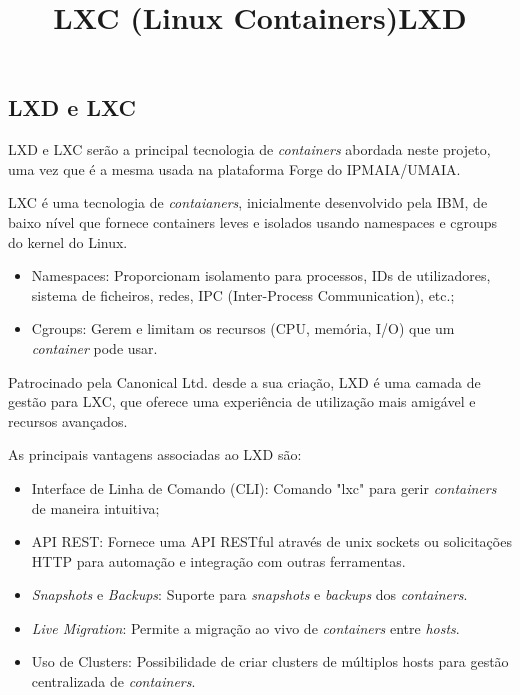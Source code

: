 \subsection{LXD e LXC}

LXD e LXC serão a principal tecnologia de \textit{containers} abordada neste projeto,
uma vez que é a mesma usada na plataforma Forge do IPMAIA/UMAIA. \\



\title*{\textbf{LXC (Linux Containers)}}

LXC é uma tecnologia de \textit{contaianers}, inicialmente desenvolvido pela IBM, 
de baixo nível que fornece containers leves e isolados usando namespaces e cgroups 
do kernel do Linux. \\

\begin{itemize}
    \item Namespaces: Proporcionam isolamento para processos, IDs de utilizadores, 
    sistema de ficheiros, redes, IPC (Inter-Process Communication), etc.;
    \item Cgroups: Gerem e limitam os recursos (CPU, memória, I/O) que um
    \textit{container} pode usar.
\end{itemize}

\title*{\textbf{LXD}}

Patrocinado pela Canonical Ltd. desde a sua  criação, LXD é uma camada de gestão para LXC, 
que oferece uma experiência de utilização mais amigável e recursos avançados.

As principais vantagens associadas ao LXD são:
\begin{itemize}
\item Interface de Linha de Comando (CLI): Comando "lxc" para gerir \textit{containers}
de maneira intuitiva;
\item API REST: Fornece uma API RESTful através de unix sockets ou solicitações HTTP para automação e integração com outras ferramentas.
\item \textit{Snapshots} e \textit{Backups}: Suporte para \textit{snapshots} e \textit{backups} dos \textit{containers}.
\item \textit{Live Migration}: Permite a migração ao vivo de \textit{containers} entre \textit{hosts}.
\item Uso de {Clusters}: Possibilidade de criar clusters de múltiplos hosts para gestão centralizada de \textit{containers}.
\end{itemize}


